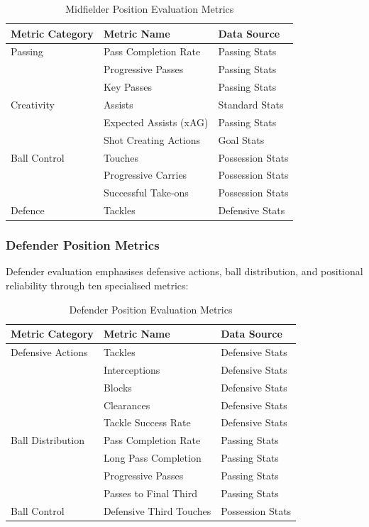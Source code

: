 \begin{table}[H]
\centering
\caption{Midfielder Position Evaluation Metrics}
\label{tab:midfielder_metrics}
\begin{tabular}{lll}
\toprule
\textbf{Metric Category} & \textbf{Metric Name} & \textbf{Data Source} \\
\midrule
Passing & Pass Completion Rate & Passing Stats \\
 & Progressive Passes & Passing Stats \\
 & Key Passes & Passing Stats \\
Creativity & Assists & Standard Stats \\
 & Expected Assists (xAG) & Passing Stats \\
 & Shot Creating Actions & Goal Stats \\
Ball Control & Touches & Possession Stats \\
 & Progressive Carries & Possession Stats \\
 & Successful Take-ons & Possession Stats \\
Defence & Tackles & Defensive Stats \\
\bottomrule
\end{tabular}
\end{table}

\subsubsection{Defender Position Metrics}

Defender evaluation emphasises defensive actions, ball distribution, and positional reliability through ten specialised metrics:

\begin{table}[H]
\centering
\caption{Defender Position Evaluation Metrics}
\label{tab:defender_metrics}
\begin{tabular}{lll}
\toprule
\textbf{Metric Category} & \textbf{Metric Name} & \textbf{Data Source} \\
\midrule
Defensive Actions & Tackles & Defensive Stats \\
 & Interceptions & Defensive Stats \\
 & Blocks & Defensive Stats \\
 & Clearances & Defensive Stats \\
 & Tackle Success Rate & Defensive Stats \\
Ball Distribution & Pass Completion Rate & Passing Stats \\
 & Long Pass Completion & Passing Stats \\
 & Progressive Passes & Passing Stats \\
 & Passes to Final Third & Passing Stats \\
Ball Control & Defensive Third Touches & Possession Stats \\
\bottomrule
\end{tabular}
\end{table}

